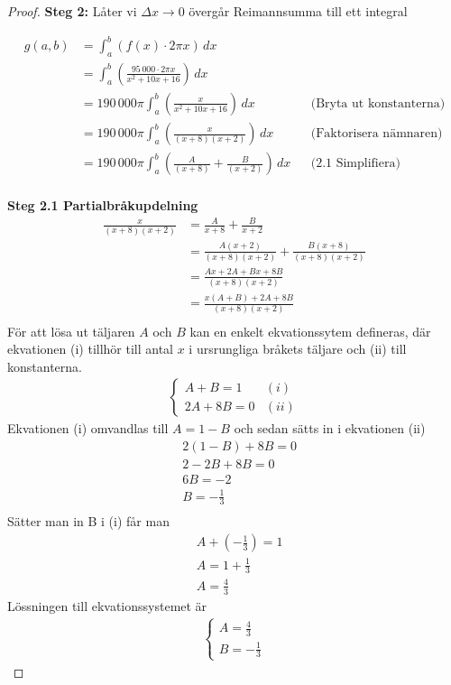 \documentclass{article}
\begin{document}
\begin{proof}
\textbf{Steg 2:} Låter vi $\Delta x \to 0$ övergår Reimannsumma till ett
integral
	
\begin{align*}
	g(a,b) &=\int_{a}^{b}{\left(f(x) \cdot 2\pi x\right) \, dx } \\
	       &= \int_{a}^{b}{\left(\frac{95\, 000 \cdot 2 \pi x}{x^2 + 10x + 16}\right) \, dx } \\
	&= 190\, 000 \pi \int_{a}^{b}{\left(\frac{x}{x^2 + 10x + 16}\right) \, dx }
	&&\text{(Bryta ut konstanterna)} \\
	&= 190\, 000 \pi \int_{a}^{b}{\left(\frac{x}{(x + 8)(x + 2)}\right) \, dx }
	&&\text{(Faktorisera nämnaren)} \\
	&= 190\, 000 \pi \int_{a}^{b}{\left(\frac{A}{(x + 8)} + \frac{B}{(x + 2)}\right) \,
	dx }
	&&\text{(2.1 Simplifiera)} \\
\end{align*}

\indent
\textbf{Steg 2.1 Partialbråkupdelning}
\begin{align*}
	\frac{x}{(x + 8)(x + 2)} &= \frac{A}{x +8} + \frac{B}{x + 2} \\
				 &= \frac{A(x + 2)}{(x + 8)(x + 2)} + \frac{B(x
				 + 8)}{(x + 8)(x + 2)} \\
				 &= \frac{Ax + 2A + Bx + 8B}{(x + 8)(x + 2)} \\
				 &= \frac{x(A + B) + 2A + 8B}{(x + 8)(x + 2)}
				 \\
\end{align*}
För att lösa ut täljaren \( A \) och \( B \) kan en enkelt ekvationssytem
defineras, där ekvationen (i) tillhör till antal \( x \)  i ursrungliga bråkets
täljare och (ii) till konstanterna.
\begin{align*}
	\begin{cases}
		A + B = 1 &(i) \\
		2A + 8B = 0 &(ii) 
	\end{cases}
\end{align*}
Ekvationen (i) omvandlas till $A = 1 - B$ och sedan sätts in i ekvationen (ii)
\begin{align*}
	&2(1 - B) + 8B = 0 \\
	&2 - 2B + 8B = 0 \\
	&6B =  -2 \\
	&B = -\frac{1}{3} \\
\end{align*}
Sätter man in B i (i) får man
\begin{align*}
	&A + (-\frac{1}{3}) = 1 \\
	&A = 1 + \frac{1}{3} \\
	&A = \frac{4}{3}
\end{align*}
Lössningen till ekvationssystemet är 
\begin{align*}
	\begin{cases}
		A = \frac{4}{3} \\
		B = - \frac{1}{3}
	\end{cases}
\end{align*}


\end{proof}
\end{document}
